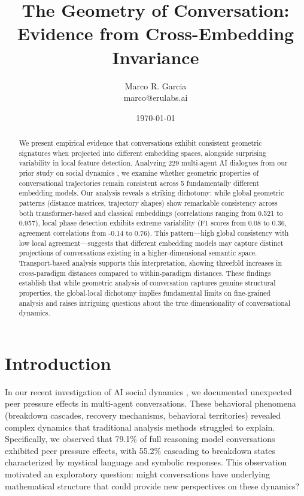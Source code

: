 \documentclass[11pt,letterpaper]{article}
\title{The Geometry of Conversation: Evidence from Cross-Embedding Invariance}
\author{
Marco R. Garcia \\
marco@erulabs.ai
}
\date{\today}
\newcommand{\totalConversations}{229}
\newcommand{\numEmbeddingModels}{5}
\newcommand{\minPairwiseCorr}{0.521}
\newcommand{\maxPairwiseCorr}{0.957}
\begin{document}
\maketitle

\begin{abstract}
We present empirical evidence that conversations exhibit consistent geometric signatures when projected into different embedding spaces, alongside surprising variability in local feature detection. Analyzing \totalConversations{} multi-agent AI dialogues from our prior study on social dynamics \citep{garcia2025peer}, we examine whether geometric properties of conversational trajectories remain consistent across \numEmbeddingModels{} fundamentally different embedding models. Our analysis reveals a striking dichotomy: while global geometric patterns (distance matrices, trajectory shapes) show remarkable consistency across both transformer-based and classical embeddings (correlations ranging from \minPairwiseCorr{} to \maxPairwiseCorr{}), local phase detection exhibits extreme variability (F1 scores from 0.08 to 0.36, agreement correlations from -0.14 to 0.76). This pattern—high global consistency with low local agreement—suggests that different embedding models may capture distinct projections of conversations existing in a higher-dimensional semantic space. Transport-based analysis supports this interpretation, showing threefold increases in cross-paradigm distances compared to within-paradigm distances. These findings establish that while geometric analysis of conversation captures genuine structural properties, the global-local dichotomy implies fundamental limits on fine-grained analysis and raises intriguing questions about the true dimensionality of conversational dynamics.
\end{abstract}

\section{Introduction}

In our recent investigation of AI social dynamics \citep{garcia2025peer}, we documented unexpected peer pressure effects in multi-agent conversations. These behavioral phenomena (breakdown cascades, recovery mechanisms, behavioral territories) revealed complex dynamics that traditional analysis methods struggled to explain. Specifically, we observed that 79.1\% of full reasoning model conversations exhibited peer pressure effects, with 55.2\% cascading to breakdown states characterized by mystical language and symbolic responses. This observation motivated an exploratory question: might conversations have underlying mathematical structure that could provide new perspectives on these dynamics?
\end{document}
